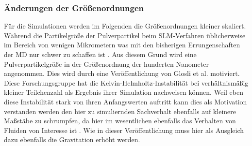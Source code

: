 		\subsubsection{Änderungen der Größenordnungen}
		Für die Simulationen werden im Folgenden die Größenordnungen kleiner skaliert. Während die
		Partikelgröße der Pulverpartikel beim SLM-Verfahren üblicherweise im Bereich von wenigen
		Mikrometern \cite{hajnys2020research} was mit den bisherigen Errungenschaften der MD nur
		schwer zu schaffen ist \cite{eckhardt2013scientists}. Aus diesem Grund wird eine
		Pulverpartikelgröße in der Größenordnung der hunderten Nanometer angenommen. Dies wird
		durch eine Veröffentlichung von Glosli et al. motiviert. Diese Forschungsgruppe hat
		die Kelvin-Helmholtz-Instabilität bei verhältnismäßig kleiner Teilchenzahl als Ergebnis
		ihrer Simulation nachweisen können. Weil eben diese Instabilität stark von ihren
		Anfangswerten auftritt kann dies als Motivation verstanden werden den hier zu simuliernden
		Sachverhalt ebenfalls auf kleinere Maßstäbe zu schrumpfen, da hier im wesentlichen ebenfalls
		das Verhalten von Fluiden von Interesse ist \cite{glosli2007extending}. Wie in dieser
		Veröffentlichung muss hier als Ausgleich dazu ebenfalls die Gravitation erhöht werden.


